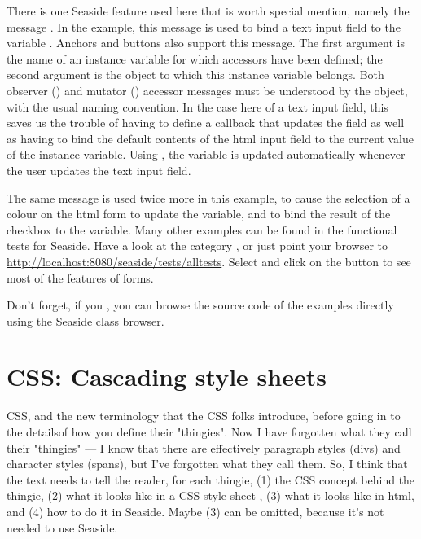 \documentclass[a4paper,10pt,twoside]{book}
\begin{document}
There is one Seaside feature used here that is worth special mention, namely the message
.
In the example, this message is used to bind a text input field to the variable
.
Anchors and buttons also support this message.
The first argument is the name of an instance variable for which accessors have been
defined; the second argument is the object to which this instance variable belongs.
Both observer () and mutator () accessor messages must be
understood by the object, with the usual naming convention.
In the case here of a text input field, this saves us the trouble of having to define a
callback that updates the field as well as having to bind the default contents of the
html input field to the current value of the instance variable.
Using , the  variable is updated automatically
whenever the user updates the text input field.

The same message is used twice more in this example, to cause the selection of a colour
on the html form to update the  variable, and to bind the result of the
checkbox to the  variable.
Many other examples can be found in the functional tests for Seaside.
Have a look at the category , or just point your browser
to \url{http://localhost:8080/seaside/tests/alltests}.
Select  and click on the  button to see most of the
features of forms.

Don't forget, if you , you can browse the source code of the
examples directly using the Seaside class browser.

\section{CSS: Cascading style sheets}

CSS, and the new terminology that the CSS folks introduce, before going in to the detailsof how you define their "thingies". Now I have forgotten what they call their "thingies"
--- I know that there are effectively paragraph styles (divs) and character styles
(spans), but I've forgotten what they call them. So, I think that the text needs to tell
the reader, for each thingie, (1) the CSS concept behind the thingie, (2) what it looks
like in a CSS style sheet , (3) what it looks like in html, and (4) how to do it in
Seaside. Maybe (3) can be omitted, because it's not needed to use Seaside.
\end{document}
